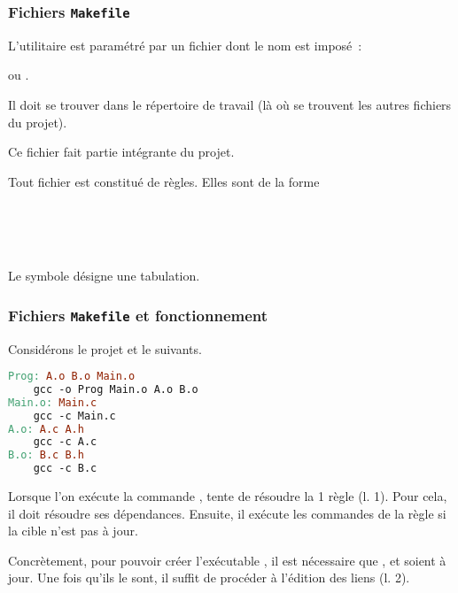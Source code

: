 \begin{frame}\frametitle{Fichiers {\tt Makefile}}
L'utilitaire  est paramétré par un fichier dont le nom est
imposé~:
\begin{center}
    \og {} \fg{} ou \og {} \fg.
\end{center}
Il doit se trouver dans le répertoire de travail (là où se trouvent les
autres fichiers du projet).
\medskip

Ce fichier fait partie intégrante du projet.
\bigskip

Tout fichier  est constitué de \alert{règles}.
Elles sont de la forme
\smallskip

 \\
 \\
\Code{\vdots} \\
\bigskip

Le symbole \og\Code{$\rightarrow$}\fg{} désigne une tabulation.
\end{frame}

\begin{frame}[fragile]
\frametitle{Fichiers {\tt Makefile} et fonctionnement}
Considérons le projet et le  suivants.
\begin{multicols}{2}
\begin{center}
\end{center}
\bigskip
\bigskip
\begin{lstlisting}[language=make]
Prog: A.o B.o Main.o
    gcc -o Prog Main.o A.o B.o
Main.o: Main.c
    gcc -c Main.c
A.o: A.c A.h
    gcc -c A.c
B.o: B.c B.h
    gcc -c B.c
\end{lstlisting}
\end{multicols}
\bigskip

Lorsque l'on exécute la commande ,  tente de
résoudre la 1\iere{} règle (l. 1). Pour cela, il doit résoudre ses
dépendances. Ensuite, il exécute les commandes de la règle si la cible
n'est pas à jour.
\medskip

Concrètement, pour pouvoir créer l'exécutable , il est
nécessaire que ,  et  soient à jour.
Une fois qu'ils le sont, il suffit de procéder à l'édition des liens
(l. 2).
\end{frame}

